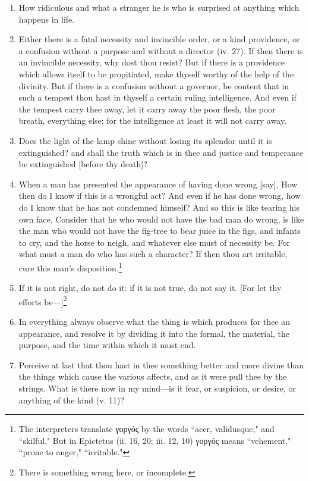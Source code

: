 \begin{enumerate}
\item How ridiculous and what a stranger he is who is surprised at anything which happens in life.

\item Either there is a fatal necessity and invincible order, or a kind providence, or a confusion without a purpose and without a director (iv. 27). If then there is an invincible necessity, why dost thou resist? But if there is a providence which allows itself to be propitiated, make thyself worthy of the help of the divinity. But if there is a confusion without a governor, be content that in such a tempest thou hast in thyself a certain ruling intelligence. And even if the tempest carry thee away, let it carry away the poor flesh, the poor breath, everything else; for the intelligence at least it will not carry away.

\item Does the light of the lamp shine without losing its splendor until it is extinguished? and shall the truth which is in thee and justice and temperance be extinguished [{\clarify before thy death}]?

\item When a man has presented the appearance of having done wrong [{\clarify say}], How then do I know if this is a wrongful act? And even if he has done wrong, how do I know that he has not condemned himself? And so this is like tearing his own face. Consider that he who would not have the bad man do wrong, is like the man who would not have the fig-tree to bear juice in the figs, and infants to cry, and the horse to neigh, and whatever else must of necessity be. For what must a man do who has such a character? If then thou art irritable, cure this man's disposition.\footnote{The interpreters translate \textgreek{γοργός} by the words ``acer, validusque," and ``skilful." But in Epictetus (ii. 16, 20; iii. 12, 10) \textgreek{γοργός} means ``vehement," ``prone to anger," ``irritable."}

\item If it is not right, do not do it: if it is not true, do not say it. [{\clarify For let thy efforts be—}]\footnote{There is something wrong here, or incomplete.}

\item In everything always observe what the thing is which produces for thee an appearance, and resolve it by dividing it into the formal, the material, the purpose, and the time within which it must end.

\item Perceive at last that thou hast in thee something better and more divine than the things which cause the various affects, and as it were pull thee by the strings. What is there now in my mind—is it fear, or suspicion, or desire, or anything of the kind (v. 11)?


\end{enumerate}
